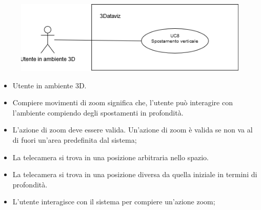 \begin{figure}[h!]
    \centering
    \includegraphics[scale=0.7]{template/images/UC8.png}
    \caption{}
\end{figure}
\UCdsc
{ %
    \begin{itemize}
        \item Utente in ambiente 3D.
    \end{itemize}
}
{ %
    \begin{itemize}
        \item Compiere movimenti di zoom significa che, l'utente può interagire con l'ambiente compiendo degli spostamenti in profondità.
    \end{itemize}
}
{ %
    \begin{itemize}
        \item L'azione di zoom deve essere valida. Un'azione di zoom è valida se non va al di fuori un'area predefinita dal sistema;
        \item La telecamera si trova in una posizione arbitraria nello spazio.
    \end{itemize}
}
{ %
    \begin{itemize}
        \item La telecamera si trova in una posizione diversa da quella iniziale in termini di profondità.
    \end{itemize}
}
{ %
    \begin{itemize}
        \item L'utente interagisce con il sistema per compiere un'azione zoom;
    \end{itemize}
}

